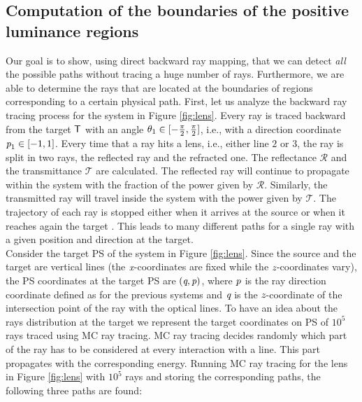 \subsection{Computation of the boundaries of the positive luminance regions}
Our goal is to show, using direct backward ray mapping, that we can detect \textit{all} the possible paths without tracing a huge number of rays. Furthermore, we are able to determine the rays that are located at the boundaries of regions corresponding to a certain physical path.
First, let us analyze the backward ray tracing process for the system in Figure \ref{fig:lens}. Every ray is traced backward from the target $\textsf{T}$ with an angle $\theta_1\in[-\frac{\pi}{2}, \frac{\pi}{2}]$, i.e., with a direction coordinate $\textit{p}_1\in[-1,1]$. Every time that a ray hits a lens, i.e., either line $2$ or $3$, the ray is split in two rays, the reflected ray and the refracted one. The reflectance $\mathcal{R}$ and the transmittance $\mathcal{T}$ are calculated. The reflected ray will continue to propagate within the system with the fraction of the power given by $\mathcal{R}$. Similarly, the transmitted ray will travel inside the system with the power given by $\mathcal{T}$. The trajectory of each ray is stopped either when it arrives at the source  or when it reaches again the target . This leads to many different paths for a single ray with a given position and direction at the target. 
\\ \indent
Consider the target PS of the system in Figure \ref{fig:lens}. Since the source and the target are vertical lines (the $\textit{x}$-coordinates are fixed while the $\textit{z}$-coordinates vary), the PS coordinates at the target PS are $(\textit{q}, \textit{p})$, where  $\textit{p}$ is the ray direction coordinate defined as for the previous systems and $\textit{q}$ is the $\textit{z}$-coordinate of the intersection point of the ray with the optical lines. To have an idea about the rays distribution at the target we represent the target coordinates on PS of $10^5$ rays traced using MC ray tracing. MC ray tracing decides randomly which part of the ray has to be considered at every interaction with a line. This part propagates with the corresponding energy. Running MC ray tracing for the lens in Figure \ref{fig:lens} with $10^5$ rays and storing the corresponding paths, the following three paths are found:
